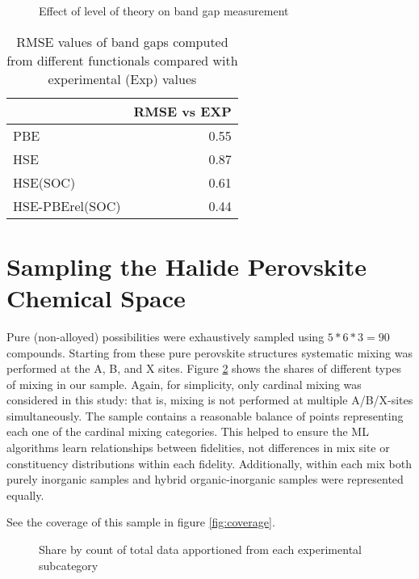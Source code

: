  
\begin{figure}[htbp]
\centering

\caption{\label{fig:expqual} Effect of level of theory on band gap measurement}
\end{figure}

 
\begin{table}[htbp]
\caption{\label{tbl:expquant} RMSE values of band gaps computed from different functionals compared with experimental (Exp) values}
\centering
\begin{tabular}{lr}
 & RMSE vs EXP\\[0pt]
\hline
PBE & 0.55\\[0pt]
HSE & 0.87\\[0pt]
HSE(SOC) & 0.61\\[0pt]
HSE-PBErel(SOC) & 0.44\\[0pt]
\end{tabular}
\end{table}

\section{Sampling the Halide Perovskite Chemical Space}
\label{sec:orgf1d20e5}
Pure (non-alloyed) possibilities were exhaustively sampled using \(5*6*3 = 90\) compounds.
Starting from these pure perovskite structures systematic mixing was performed at the A, B, and X sites.
Figure \ref{fig:lot_mix_org} shows the shares of different types of mixing in our sample.
Again, for simplicity, only cardinal mixing was considered in this study: that is, mixing is not performed at multiple A/B/X-sites simultaneously.
The sample contains a reasonable balance of points representing each one of the cardinal mixing categories.
This helped to ensure the ML algorithms learn relationships between fidelities, not differences in mix site or constituency distributions within each fidelity.
Additionally, within each mix both purely inorganic samples and hybrid organic-inorganic samples were represented equally.

See the coverage of this sample in figure \ref{fig:coverage}.

 
\begin{figure}[htbp]
\centering

\caption{\label{fig:lot_mix_org} Share by count of total data apportioned from each experimental subcategory}
\end{figure}

